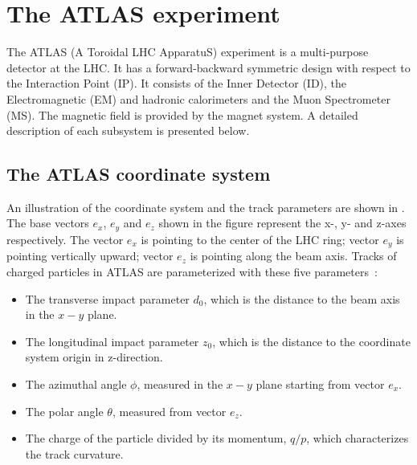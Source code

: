 \section{The ATLAS experiment}

% 

The ATLAS (A Toroidal LHC ApparatuS) experiment is a multi-purpose detector at the LHC. It has a forward-backward symmetric design with respect to the Interaction Point (IP).
It consists of the Inner Detector (ID), the Electromagnetic (EM) and hadronic calorimeters and the Muon Spectrometer (MS). The magnetic field is provided by the magnet system. A detailed description of each subsystem is presented below.

\subsection{The ATLAS coordinate system}

An illustration of the coordinate system and the track parameters are shown in .
The base vectors $e_x$, $e_y$ and $e_z$ shown in the figure represent the x-, y- and z-axes respectively. The vector $e_x$ is pointing to the center of the LHC ring;
vector $e_y$ is pointing vertically upward; vector $e_z$ is pointing along the beam axis. 
Tracks of charged particles in ATLAS are parameterized with these five parameters~\cite{track_parameterization}:
\begin{itemize}
 \item The transverse impact parameter $d_0$, which is the distance to the beam axis in the $x-y$ plane. 
 \item The longitudinal impact parameter $z_0$, which is the distance to the coordinate system origin in z-direction.
 \item The azimuthal angle $\phi$, measured in the $x-y$ plane starting from vector $e_x$. 
 \item The polar angle $\theta$, measured from vector $e_z$.
 \item The charge of the particle divided by its momentum, $q/p$, which characterizes the track curvature.
\end{itemize}

